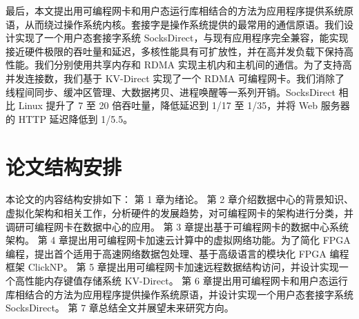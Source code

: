 最后，本文提出用可编程网卡和用户态运行库相结合的方法为应用程序提供系统原语，从而绕过操作系统内核。套接字是操作系统提供的最常用的通信原语。我们设计实现了一个用户态套接字系统 SocksDirect，与现有应用程序完全兼容，能实现接近硬件极限的吞吐量和延迟，多核性能具有可扩放性，并在高并发负载下保持高性能。我们分别使用共享内存和 RDMA 实现主机内和主机间的通信。为了支持高并发连接数，我们基于 KV-Direct 实现了一个 RDMA 可编程网卡。我们消除了线程间同步、缓冲区管理、大数据拷贝、进程唤醒等一系列开销。SocksDirect 相比 Linux 提升了 7 至 20 倍吞吐量，降低延迟到 1/17 至 1/35，并将 Web 服务器的 HTTP 延迟降低到 1/5.5。


\section{论文结构安排}

本论文的内容结构安排如下：
第 1 章为绪论。
第 2 章介绍数据中心的背景知识、虚拟化架构和相关工作，分析硬件的发展趋势，对可编程网卡的架构进行分类，并调研可编程网卡在数据中心的应用。
第 3 章提出基于可编程网卡的数据中心系统架构。
第 4 章提出用可编程网卡加速云计算中的虚拟网络功能。为了简化 FPGA 编程，提出首个适用于高速网络数据包处理、基于高级语言的模块化 FPGA 编程框架 ClickNP。
第 5 章提出用可编程网卡加速远程数据结构访问，并设计实现一个高性能内存键值存储系统 KV-Direct。
第 6 章提出用可编程网卡和用户态运行库相结合的方法为应用程序提供操作系统原语，并设计实现一个用户态套接字系统 SocksDirect。
第 7 章总结全文并展望未来研究方向。